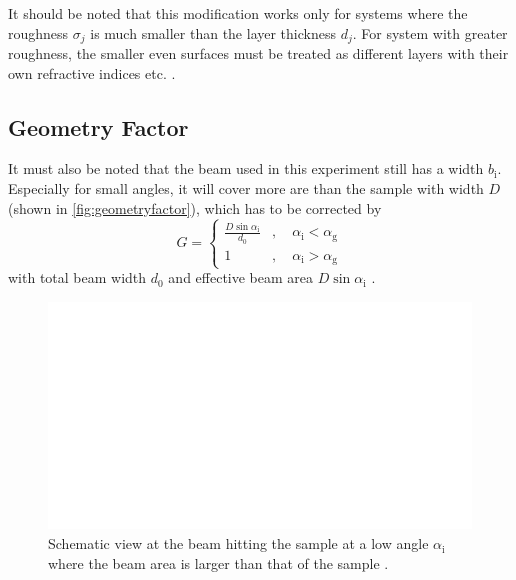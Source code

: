 It should be noted that this modification works only for systems where the roughness $\sigma_j$ is much smaller than the layer thickness $d_j$.
For system with greater roughness, the smaller even surfaces must be treated as different layers with their own refractive indices etc. \cite{tolan}.

\subsection{Geometry Factor}

It must also be noted that the beam used in this experiment still has a width $b_\text{i}$.
Especially for small angles, it will cover more are than the sample with width $D$ (shown in \autoref{fig:geometryfactor}), 
which has to be corrected by
\begin{equation}
    G = \begin{cases}
        \frac{D \sin\alpha_\text{i}}{d_0}&, \quad \alpha_ \text{i} < \alpha_\text{g} \\
        1&,\quad \alpha_\text{i} > \alpha_\text{g}
    \end{cases}
    \label{eq:GeometryFactor}
\end{equation}
with total beam width $d_0$ and effective beam area $D \sin\alpha_\text{i}$ \cite{v44}.

\begin{figure}[H]
    \centering
    \includegraphics{figures/beam_width.pdf}
    \caption{Schematic view at the beam hitting the sample at a low angle $\alpha_\text{i}$ where the beam area is larger than that of the sample \cite{v44}.}
    \label{fig:geometryfactor}
\end{figure}




